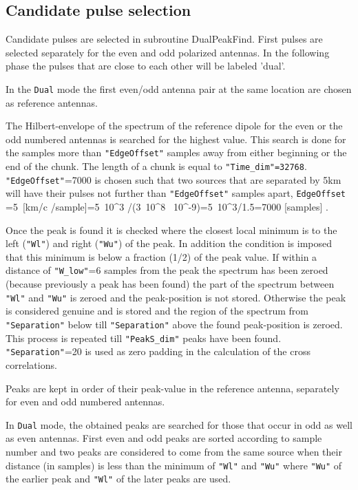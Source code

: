 \subsection{Candidate pulse selection}


Candidate pulses are selected in subroutine DualPeakFind. First pulses are selected separately for the even and odd polarized antennas. In the following phase the pulses that are close to each other will be labeled 'dual'.

In the \verb!Dual! mode the first even/odd antenna pair at the same location are chosen as reference antennas.

The Hilbert-envelope of the spectrum of the reference dipole for the even or the odd numbered antennas is searched for the highest value. This search is done for the samples more than \verb!"EdgeOffset"! samples away from either beginning or the end of the chunk. The length of a chunk is equal to \verb!"Time_dim"=32768!. \verb!"EdgeOffset"!=7000 is chosen such that two sources that are separated by 5km  will have their pulses not further than \verb!"EdgeOffset"! samples apart,
\beq
\texttt{EdgeOffset} =5\ \rm{[km/c /sample]}=5\, 10^3 /(3\, 10^8 \, 10^{-9})=5\, 10^3/1.5=7000\; \rm{[samples]} \;.
\eeq

Once the peak is found it is checked where the closest local minimum is to the left (\verb!"Wl"!) and right (\verb!"Wu"!) of the peak. In addition the condition is imposed that this minimum is below a fraction (1/2) of the peak value. If within a distance of \verb!"W_low"!=6 samples from the peak the spectrum has been zeroed (because previously a peak has been found) the part of the spectrum between \verb!"Wl"! and \verb!"Wu"! is zeroed and the peak-position is not stored. Otherwise the peak is considered genuine and is stored and the region of the spectrum from \verb!"Separation"! below till \verb!"Separation"! above the found peak-position is zeroed. This process is repeated till \verb!"PeakS_dim"! peaks have been found. \verb!"Separation"!=20 is used as zero padding in the calculation of the cross correlations.

Peaks are kept in order of their peak-value in the reference antenna, separately for even and odd numbered antennas.

In \verb!Dual! mode, the obtained peaks are searched for those that occur in odd as well as even antennas. First even and odd peaks are sorted according to sample number and two peaks are considered to come from the same source when their distance (in samples) is less than the minimum of \verb!"Wl"! and \verb!"Wu"! where \verb!"Wu"! of the earlier peak and \verb!"Wl"! of the later peaks are used.

